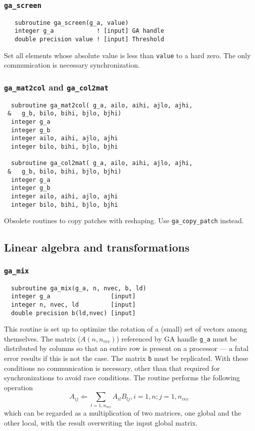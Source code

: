 \subsubsection{{\tt ga\_screen}}
\begin{verbatim}
   subroutine ga_screen(g_a, value)
   integer g_a            ! [input] GA handle
   double precision value ! [input] Threshold
\end{verbatim}
Set all elements whose absolute value is less than {\tt value} to a
hard zero.  The only communication is necessary synchronization.

\subsubsection{{\tt ga\_mat2col} and {\tt ga\_col2mat}}
\begin{verbatim}
  subroutine ga_mat2col( g_a, ailo, aihi, ajlo, ajhi,
 &   g_b, bilo, bihi, bjlo, bjhi)
  integer g_a
  integer g_b
  integer ailo, aihi, ajlo, ajhi
  integer bilo, bihi, bjlo, bjhi

  subroutine ga_col2mat( g_a, ailo, aihi, ajlo, ajhi,
 &   g_b, bilo, bihi, bjlo, bjhi)
  integer g_a
  integer g_b
  integer ailo, aihi, ajlo, ajhi
  integer bilo, bihi, bjlo, bjhi
\end{verbatim}
Obsolete routines to copy patches with reshaping. Use \verb+ga_copy_patch+
instead.

\subsection{Linear algebra and transformations}

\subsubsection{{\tt ga\_mix}}
\begin{verbatim}
  subroutine ga_mix(g_a, n, nvec, b, ld)
  integer g_a                 [input]
  integer n, nvec, ld         [input]
  double precision b(ld,nvec) [input]
\end{verbatim}
This routine is set up to optimize the rotation of a (small) set of
vectors among themselves.  The matrix ($A(n,n_{vec})$) referenced by
GA handle \verb+g_a+ must be distributed by columns so that an entire
row is present on a processor --- a fatal error results if this is not
the case.  The matrix {\tt b} must be replicated.  With these
conditions no communication is necessary, other than that required for
synchronizations to avoid race conditions.  The routine performs the
following operation
\begin{displaymath}
     A_{ij} \Leftarrow \sum_{l=1,n_{vec}} A_{il} B_{lj}, i=1,n; j=1,n_{vec}
\end{displaymath}
which can be regarded as a multiplication of two matrices, one global
and the other local, with the result overwriting the input global
matrix.

